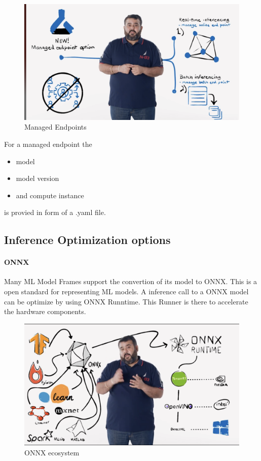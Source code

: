 \begin{figure}[H]
	\centering	\includegraphics[scale = 0.2]{attachment/chapter_10/Scc017}
\caption{Managed Endpoints}
\end{figure}

For a managed endpoint the 
\begin{itemize}
	\item model 
	\item model version
	\item and compute instance
\end{itemize}

is provied in form of a \gls{.yaml} file.

\subsection{Inference Optimization options}

\paragraph{ONNX}
Many \gls{ML} Model Frames support the convertion of its model to \gls{ONNX}. This is a open standard for representing \gls{ML} models. A inference call to a \gls{ONNX} model can be optimize by using \gls{ONNX} Runntime. This Runner is there to accelerate the hardware components.

\begin{figure}[H]
	\centering	\includegraphics[scale = 0.2]{attachment/chapter_10/Scc018}
\caption{\gls{ONNX} ecosystem}
\end{figure}

